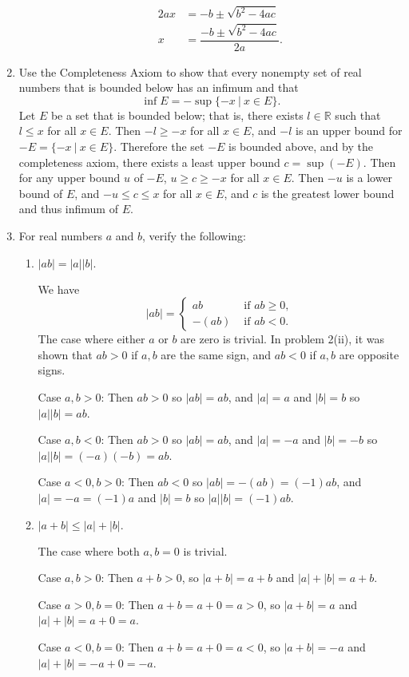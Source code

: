 \documentclass[a4paper,10pt]{book}
\theoremstyle{plain} %
\begin{document}
\begin{enumerate}
\begin{enumerate}[label=(\roman*),align=left]
\begin{align*}
			2ax & = -b \pm \sqrt{b^2-4ac} \\
			x & = \dfrac{-b \pm \sqrt{b^2-4ac}}{2a}.
		\end{align*}
	\end{enumerate}
	\item Use the Completeness Axiom to show that every nonempty set of real numbers that is bounded below has an infimum and that
	\[\inf E =-\sup \{-x \ |\ x \in E\}.\]
	Let $E$ be a set that is bounded below; that is, there exists $l\in \mathbb{R}$ such that $l \le x$ for all $x\in E$.
	Then $-l \ge -x$ for all $x \in E$, and $-l$ is an upper bound for $-E=\{-x \ | \ x\in E\}$. 
	Therefore the set $-E$ is bounded above, and by the completeness axiom, there exists a least upper bound $c= \sup (-E)$.
	Then for any upper bound $u$ of $-E$, $u \ge c \ge -x$ for all $x \in E.$
	Then $-u$ is a lower bound of $E$, and $-u \le c \le x$ for all $x \in E$, and $c$ is the greatest lower bound and thus infimum of $E$.
	\item For real numbers $a$ and $b$, verify the following:
	\begin{enumerate}[label=(\roman*),align=left]
		\item $|ab| = |a||b|.$\par
		We have 
		\[ 
		|ab| =
		\begin{cases} 
			ab & \text{ if } ab \ge 0, \\
			-(ab) & \text{ if } ab < 0.
		\end{cases}
		\]
		The case where either $a$ or $b$ are zero is trivial.
		In problem 2(ii), it was shown that $ab>0$ if $a,b$ are the same sign, and $ab<0$ if $a,b$ are opposite signs.\par
		Case $a,b>0$: Then $ab>0$ so $|ab| = ab$, and $|a| = a$ and $|b|=b$ so $|a||b| = ab$.\par
		Case $a,b<0$: Then $ab>0$ so $|ab| = ab$, and $|a| = -a$ and $|b|=-b$ so $|a||b| = (-a)(-b)=ab$.\par
		Case $a<0,b>0$: Then $ab<0$ so $|ab| = -(ab) = (-1)ab$, and $|a| = -a = (-1)a$ and $|b|=b$ so $|a||b| = (-1)ab$.
		\item $|a+b| \le |a|+|b|.$\par
		The case where both $a,b=0$ is trivial.\par
		Case $a,b>0$: Then $a+b > 0 $, so $|a+b| = a+b$ and $|a|+|b| = a+ b$.\par
		Case $a>0,b=0$: Then $a+b = a+0=a > 0 $, so $|a+b| = a$ and $|a|+|b| = a+ 0 = a$.\par
		Case $a<0,b=0$: Then $a+b = a +0=a<0 $, so $|a+b| = -a$ and $|a|+|b| = -a +0 = -a$.\par

\end{enumerate}
\end{enumerate}
\end{document}
